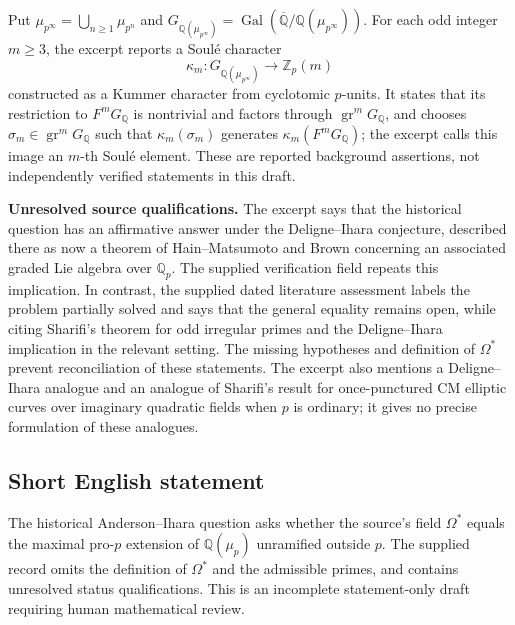 \documentclass[11pt]{article}
\newcommand{\Z}{\mathbb{Z}}
\newcommand{\Q}{\mathbb{Q}}
\begin{document}
Put \(\mu_{p^{\infty}}=\bigcup_{n\geq1}\mu_{p^n}\) and \(G_{\Q(\mu_{p^{\infty}})}=\operatorname{Gal}(\overline{\Q}/\Q(\mu_{p^{\infty}}))\). For each odd integer \(m\geq3\), the excerpt reports a Soul\'e character
\[
\kappa_m:G_{\Q(\mu_{p^{\infty}})}\longrightarrow\Z_p(m)
\]
constructed as a Kummer character from cyclotomic \(p\)-units. It states that its restriction to \(F^mG_{\Q}\) is nontrivial and factors through \(\operatorname{gr}^mG_{\Q}\), and chooses \(\sigma_m\in\operatorname{gr}^mG_{\Q}\) such that \(\kappa_m(\sigma_m)\) generates \(\kappa_m(F^mG_{\Q})\); the excerpt calls this image an \(m\)-th Soul\'e element. These are reported background assertions, not independently verified statements in this draft.

\textbf{Unresolved source qualifications.} The excerpt says that the historical question has an affirmative answer under the Deligne--Ihara conjecture, described there as now a theorem of Hain--Matsumoto and Brown concerning an associated graded Lie algebra over \(\Q_p\). The supplied verification field repeats this implication. In contrast, the supplied dated literature assessment labels the problem partially solved and says that the general equality remains open, while citing Sharifi's theorem for odd irregular primes and the Deligne--Ihara implication in the relevant setting. The missing hypotheses and definition of \(\Omega^{*}\) prevent reconciliation of these statements. The excerpt also mentions a Deligne--Ihara analogue and an analogue of Sharifi's result for once-punctured CM elliptic curves over imaginary quadratic fields when \(p\) is ordinary; it gives no precise formulation of these analogues.
\subsection{Short English statement}
The historical Anderson--Ihara question asks whether the source's field \(\Omega^{*}\) equals the maximal pro-\(p\) extension of \(\Q(\mu_p)\) unramified outside \(p\). The supplied record omits the definition of \(\Omega^{*}\) and the admissible primes, and contains unresolved status qualifications. This is an incomplete statement-only draft requiring human mathematical review.
\end{document}
